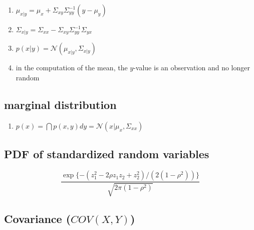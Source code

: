 \begin{enumerate}[itemsep=0.3cm]
    \item $
        \mu_{x|y} 
        = \mu_x + \Sigma_{xy} \Sigma_{yy}^{-1} (y-\mu_y)
    $

    \item $
        \Sigma_{x|y}
        = \Sigma_{xx} - \Sigma_{xy} \Sigma_{yy}^{-1} \Sigma_{yx}
    $
    
    \item $
        p(x|y) = \mathcal{N}(\mu_{x|y}, \Sigma_{x|y})
    $

    \item in the computation of the mean, the $y$-value is an observation and no longer random
\end{enumerate}


\subsection{marginal distribution \cite{mfml-1}} \label{Normal distribution: Bivariate/ Multivariate: marginal distribution}

\begin{enumerate}[itemsep=0.3cm]
    \item $
        p(x)
        = \dint p(x,y)dy
        = \mathcal{N}(x|\mu_x, \Sigma_{xx})
    $

\end{enumerate}


\subsection{PDF of standardized random variables \cite{ism-1}} \label{Normal distribution: Bivariate/ Multivariate: PDF of standardized random variables}

\[
    \dfrac{
        \exp\{ 
            -(z_1^2 - 2\rho z_1 z_2 + z_2^2)/
            (2(1-\rho^2))
        \}
    }{
        \sqrt{2\pi(1-\rho^2)}
    }
\]


\subsection{Covariance ($COV(X,Y)$) \cite{ism-1}} \label{Normal distribution: Bivariate/ Multivariate: Covariance}

